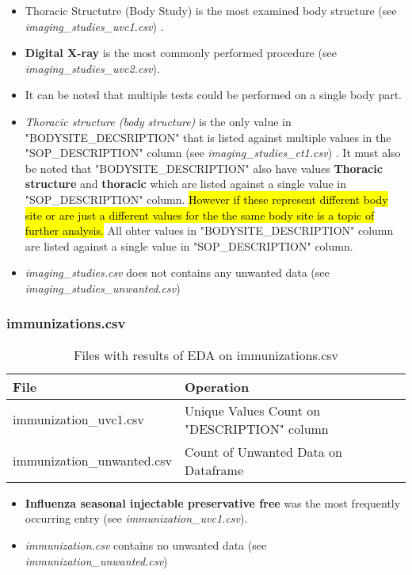 \documentclass[12pt, twosided]{report}  %
\begin{document}
\begin{itemize}
	
	\item Thoracic Structutre (Body Study) is the most examined body structure (see \textit{imaging\_studies\_uvc1.csv}) .
	
	\item \textbf{Digital X-ray} is the most commonly performed procedure (see \textit{imaging\_studies\_uvc2.csv}).
	
	\item It can be noted that multiple tests could be performed on a single body part.

	\item \textit{Thoracic structure (body structure)} is the only value in "BODYSITE\_DECSRIPTION" that is listed against multiple values in the "SOP\_DESCRIPTION" column (see \textit{imaging\_studies\_ct1.csv}) . It must also be noted that "BODYSITE\_DESCRIPTION" also have values \textbf{Thoracic structure} and \textbf{thoracic} which are listed against a single value in "SOP\_DESCRIPTION"  column. \hl{However if these represent different body site or are just a different values for the the same body site is a topic of further analysis.} All ohter values in "BODYSITE\_DESCRIPTION" column are listed against a single value in "SOP\_DESCRIPTION" column. 
	
	\item \textit{imaging\_studies.csv} does not contains any unwanted data (see \textit{imaging\_studies\_unwanted.csv})
	
\end{itemize}

\subsubsection{immunizations.csv}

\begin{table}[H]
	\centering
	\begin{tabular}{p{5cm}|p{14.5cm}}
		\textbf{File}              & \textbf{Operation} \\ \hline
		immunization\_uvc1.csv     & Unique Values Count on "DESCRIPTION" column\\
		immunization\_unwanted.csv & Count of Unwanted Data on Dataframe
	\end{tabular}
	\caption{Files with results of EDA on immunizations.csv}
\end{table}


\begin{itemize}
	
	\item \textbf{Influenza  seasonal  injectable  preservative free} was the most frequently occurring entry (see \textit{immunization\_uvc1.csv}).

	\item \textit{immunization.csv} contains no unwanted data (see \textit{immunization\_unwanted.csv})
	
\end{itemize}
\end{document}
